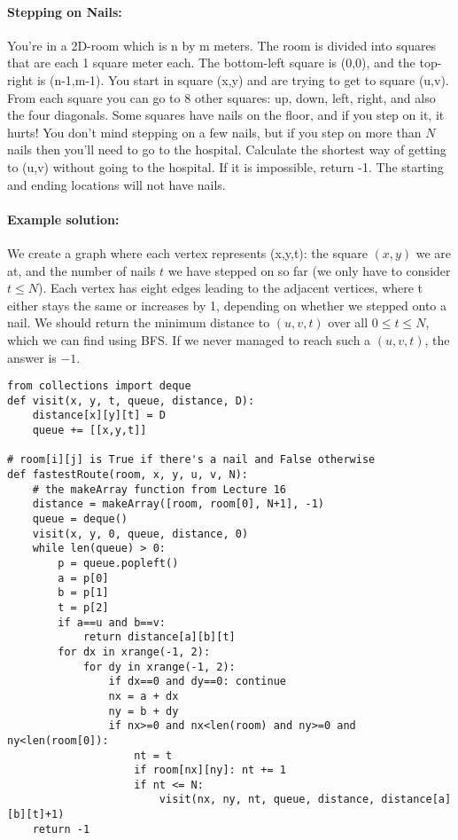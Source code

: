 \documentclass[11pt]{article}
\begin{document}
\paragraph{\Large Stepping on Nails:}
You're in a 2D-room which is n by m meters.  
The room is divided into
squares that are each 1 square meter each.  
The bottom-left square is (0,0), and the top-right is (n-1,m-1).
You start in square (x,y) and are trying to get to square (u,v).  
From each square you can go to 8 other squares: up, down, left, right,
and also the four diagonals.
Some
squares have nails on the floor, and if you step on it, it hurts!  You
don't mind stepping on a few nails, but if you step on more than $N$
nails then you'll need to go to the hospital.  Calculate the shortest
way of getting to (u,v) without going to the hospital.  
If it is impossible, return -1.
The starting and ending locations will not have nails.

\paragraph{Example solution:}
We create a graph where each vertex represents (x,y,t): the square
$(x,y)$ we are at, and the number of nails $t$ we have stepped on so
far (we only have to consider $t \le N$).  Each vertex has eight edges
leading to the adjacent vertices,
where t either stays the same or increases by 1, depending on whether
we stepped onto a nail.  We should return the minimum distance to
$(u,v,t)$ over all $0\le t \le N$, which we can find using BFS.  If we
never managed to reach such a $(u,v,t)$, the answer is $-1$.

\begin{verbatim}
from collections import deque
def visit(x, y, t, queue, distance, D):
    distance[x][y][t] = D
    queue += [[x,y,t]]

# room[i][j] is True if there's a nail and False otherwise
def fastestRoute(room, x, y, u, v, N):
    # the makeArray function from Lecture 16
    distance = makeArray([room, room[0], N+1], -1)
    queue = deque()
    visit(x, y, 0, queue, distance, 0)
    while len(queue) > 0:
        p = queue.popleft()
        a = p[0]
        b = p[1]
        t = p[2]
        if a==u and b==v:
            return distance[a][b][t]
        for dx in xrange(-1, 2):
            for dy in xrange(-1, 2):
                if dx==0 and dy==0: continue
                nx = a + dx
                ny = b + dy
                if nx>=0 and nx<len(room) and ny>=0 and ny<len(room[0]):
                    nt = t
                    if room[nx][ny]: nt += 1
                    if nt <= N:
                        visit(nx, ny, nt, queue, distance, distance[a][b][t]+1)
    return -1
\end{verbatim}
\end{document}
